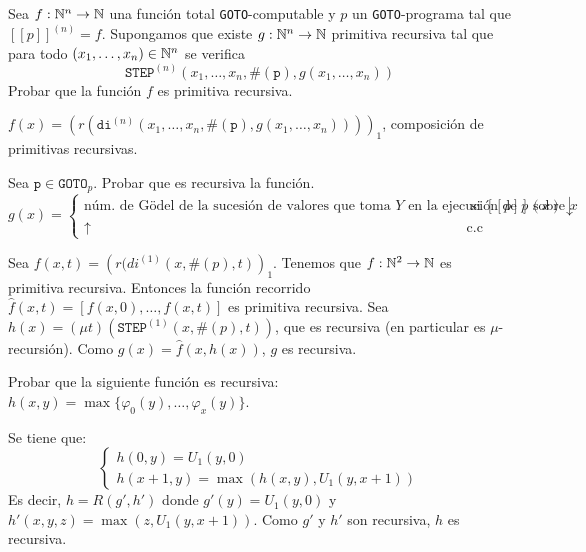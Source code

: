 \documentclass[twoside]{article}
\begin{document}
\begin{ejercicio}{10}
Sea $f : \mathbb{N}^n \to \mathbb{N}$ una función total \texttt{GOTO}-computable y $p$ un \texttt{GOTO}-programa tal que $[\![p]\!]^{(n)} = f$. Supongamos que existe $g : \mathbb{N}^n \to \mathbb{N}$ primitiva recursiva tal que para todo $(x_1,\dots,x_n) \in \mathbb{N}^n$ se verifica
\[ \texttt{STEP}^{(n)}(x_1,\dots,x_n,\#(\texttt{p}),g(x_1,\dots,x_n)) \]
Probar que la función $f$ es primitiva recursiva.
\end{ejercicio}
\begin{solucion}
$f(x)=(r(\texttt{di}^{(n)}(x_1,\dots,x_n,\#(\texttt{p}),g(x_1,\dots,x_n))))_1$, composición de primitivas recursivas.
\end{solucion}
\newpage
\begin{ejercicio}{11}
Sea $\texttt{p} \in \texttt{GOTO}_p$. Probar que es recursiva la función.
\[ g(x) = \begin{cases}
	\text{núm. de Gödel de la sucesión de valores que toma }Y\text{ en la ejecución de }p\text{ sobre }x &\text{ si }[\![p]\!](x)\downarrow\\
	\uparrow & \text{c.c}
\end{cases} \]
\end{ejercicio}
\begin{solucion}
Sea $f(x,t)=\left(r(di^{(1)}(x,\#(p),t)\right)_1$. Tenemos que $f : \mathbb{N}^2 \to \mathbb{N}$ es primitiva recursiva. Entonces la función recorrido $\hat{f}(x,t) = [f(x,0),\dots,f(x,t)]$ es primitiva recursiva. Sea $h(x) = (μt) (\texttt{STEP}^{(1)} (x,\#(p),t))$, que es recursiva (en particular es $μ$-recursión). Como $g(x) = \hat{f}(x,h(x))$, $g$ es recursiva.
\end{solucion}

\newpage
\begin{ejercicio}{12}
Probar que la siguiente función es recursiva: $h(x,y) = \max\{φ_0(y),\dots,φ_x(y)\}$.
\end{ejercicio}
\begin{solucion}
Se tiene que:
\[ \begin{cases}
	h(0,y) = U_1(y,0)\\
	h(x+1,y) = \max(h(x,y),U_1(y,x+1))
\end{cases}\]
Es decir, $h = R(g',h')$ donde $g'(y) = U_1(y,0)$ y $h'(x,y,z)=\max(z,U_1(y,x+1))$. Como $g'$ y $h'$ son recursiva, $h$ es recursiva.
\end{solucion}

\newpage
\end{document}
